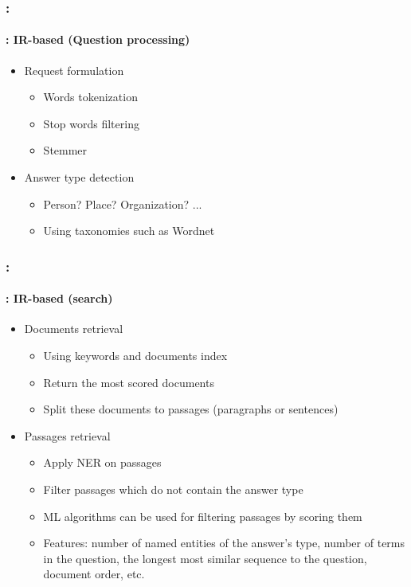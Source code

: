 \documentclass[xcolor=table]{beamer}
\begin{document}
\begin{frame}
	\frametitle{\insertshortsubtitle: \insertsection}
	\framesubtitle{\insertsubsection: IR-based (Question processing)}
	
	\begin{itemize}
		\item Request formulation
		\begin{itemize}
			\item Words tokenization
			\item Stop words filtering
			\item Stemmer  
		\end{itemize}
	    \item Answer type detection
	    \begin{itemize}
	    	\item Person? Place? Organization? ...
	    	\item Using taxonomies such as Wordnet  
	    \end{itemize}
	\end{itemize}
	
\end{frame}

\begin{frame}
	\frametitle{\insertshortsubtitle: \insertsection}
	\framesubtitle{\insertsubsection: IR-based (search)}
	
	\begin{itemize}
		\item Documents retrieval
		\begin{itemize}
			\item Using keywords and documents index
			\item Return the most scored documents
			\item Split these documents to passages (paragraphs or sentences)
		\end{itemize}
		\item Passages retrieval
		\begin{itemize}
			\item Apply NER on passages
			\item Filter passages which do not contain the answer type
			\item ML algorithms can be used for filtering passages by scoring them
			\item Features: number of named entities of the answer's type, number of terms in the question, the longest most similar sequence to the question, document order, etc.
		\end{itemize}
	\end{itemize}
	
\end{frame}
\end{document}

